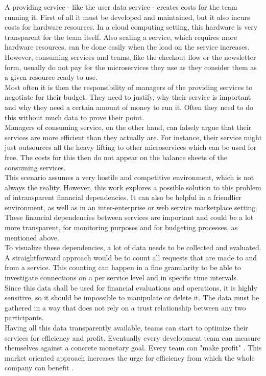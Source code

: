 \documentclass[a4paper,12pt]{scrartcl}
\begin{document}
A providing service - like the user data service - creates costs for the team running it. First of all it must be developed and maintained, but it also incurs costs for hardware resources. In a cloud computing setting, this hardware is very transparent for the team itself. Also scaling a service, which requires more hardware resources, can be done easily when the load on the service increases. \\
However, consuming services and teams, like the checkout flow or the newsletter form, usually do not pay for the microservices they use as they consider them as a given resource ready to use.\\
Most often it is then the responsibility of managers of the providing services to negotiate for their budget. They need to justify, why their service is important and why they need a certain amount of money to run it. Often they need to do this without much data to prove their point.\\
Managers of consuming service, on the other hand, can falsely argue that their services are more efficient than they actually are. For instance, their service might just outsources all the heavy lifting to other microservices which can be used for free. The costs for this then do not appear on the balance sheets of the consuming services.\\
This scenario assumes a very hostile and competitive environment, which is not always the reality. However, this work explores a possible solution to this problem of intransparent financial dependencies. It can also be helpful in a friendlier environment, as well as in an inter-enterprise or web service marketplace setting.\\

These financial dependencies between services are important and could be a lot more transparent, for monitoring purposes and for budgeting processes, as mentioned above.\\

To visualize these dependencies, a lot of data needs to be collected and evaluated. A straightforward approach would be to count all requests that are made to and from a service. This counting can happen in a fine granularity to be able to investigate connections on a per service level and in specific time intervals.\\
Since this data shall be used for financial evaluations and operations, it is highly sensitive, so it should be impossible to manipulate or delete it. The data must be gathered in a way that does not rely on a trust relationship between any two participants.\\
Having all this data transparently available, teams can start to optimize their services for efficiency and profit. Eventually every development team can measure themselves against a concrete monetary goal. Every team can "make profit" \cite{web3}. This market oriented approach increases the urge for efficiency from which the whole company can benefit \cite{png2013managerial}.\\
\end{document}
